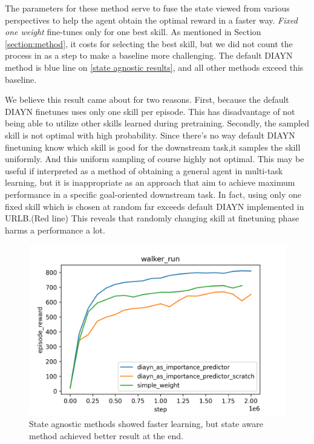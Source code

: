 The parameters for these method serve to fuse the state viewed from various perspectives to help the agent obtain the optimal reward in a faster way.
\emph{Fixed one weight} fine-tunes only for one best skill. As mentioned in Section \ref{section:method}, it costs for selecting the best skill,
but we did not count the process in as a step to make a baseline more challenging. The default DIAYN method is blue line on \cref*{state agnostic results}, and all other methods exceed this baseline.

We believe this result came about for two reasons.
First, because the default DIAYN finetunes uses only one skill per episode.
This has disadvantage of not being able to utilize other skills learned during pretraining.
Secondly, the sampled skill is not optimal with high probability.
Since there's no way default DIAYN finetuning know which skill is good for the downstream task,it samples the skill uniformly.
And this uniform sampling of course highly not optimal.
This may be useful if interpreted as a method of obtaining a general agent in multi-task learning,
but it is inappropriate as an approach that aim to achieve maximum performance in a specific goal-oriented downstream task.
In fact, using only one fixed skill which is chosen at random far exceeds default DIAYN implemented in URLB.(Red line)
This reveals that randomly changing skill at finetuning phase harms a performance a lot.

\begin{figure}[ht]
  \vskip 0.2in
  \begin{center}
  \centerline{\includegraphics[width=\columnwidth]{Figures/diayn_as_importance_predictor.png}}
  \caption{State agnostic methods showed faster learning, but state aware method achieved better result at the end.}
  \label{diayn-as-skill-weight}
  \end{center}
  \vskip -0.2in
  \end{figure}


